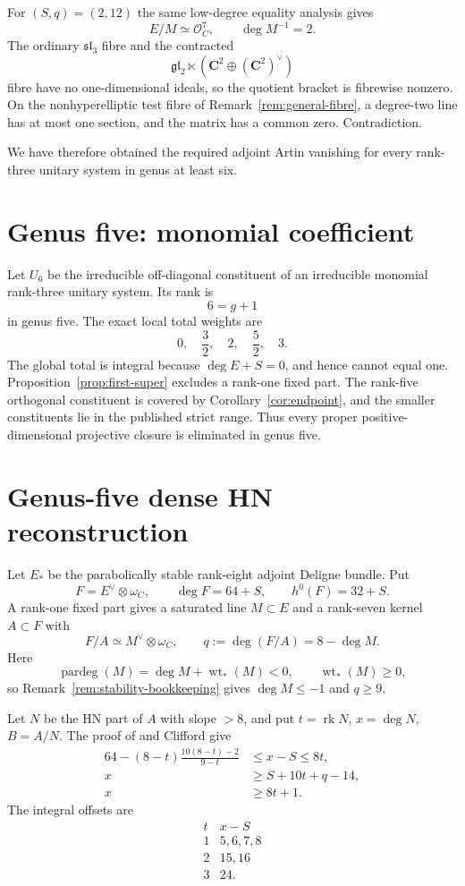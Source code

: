 \documentclass[11pt]{article}
\theoremstyle{definition}
\newcommand{\C}{\mathbf C}
\newcommand{\Ocal}{\mathcal O}
\newcommand{\rk}{\operatorname{rk}}
\newcommand{\degp}{\operatorname{pardeg}}
\begin{document}
For $(S,q)=(2,12)$ the same low-degree equality analysis gives
\[
 E/M\simeq\Ocal_C^7,
 \qquad \deg M^{-1}=2.
\]
The ordinary $\mathfrak{sl}_3$ fibre and the contracted
\[
 \mathfrak{gl}_2\ltimes(\C^2\oplus(\C^2)^\vee)
\]
fibre have no one-dimensional ideals, so the quotient bracket is fibrewise
nonzero.  On the nonhyperelliptic test fibre of
Remark~\ref{rem:general-fibre}, a degree-two line has at
most one section, and the matrix has a common zero.  Contradiction.

We have therefore obtained the required adjoint Artin vanishing for every
rank-three unitary system in genus at least six.

\section{Genus five: monomial coefficient}\label{sec:monomial5}

Let $U_6$ be the irreducible off-diagonal constituent of an irreducible
monomial rank-three unitary system.  Its rank is
\[
 6=g+1
\]
in genus five.  The exact local total weights are
\[
 0,\quad\frac32,\quad2,\quad\frac52,\quad3.
\]
The global total is integral because $\deg E+S=0$, and hence cannot equal
one.  Proposition~\ref{prop:first-super} excludes a rank-one fixed part.
The rank-five orthogonal constituent is covered by
Corollary~\ref{cor:endpoint}, and the smaller constituents lie in the
published strict range.  Thus every proper positive-dimensional projective
closure is eliminated in genus five.

\section{Genus-five dense HN reconstruction}\label{sec:hn5}

Let $E_*$ be the parabolically stable rank-eight adjoint Deligne bundle.  Put
\[
 F=E^\vee\otimes\omega_C,
 \qquad
 \deg F=64+S,
 \qquad
 h^0(F)=32+S.
\]
A rank-one fixed part gives a saturated line $M\subset E$ and a rank-seven
kernel $A\subset F$ with
\[
 F/A\simeq M^\vee\otimes\omega_C,
 \qquad
 q:=\deg(F/A)=8-\deg M.
\]
Here
\[
 \degp(M)=\deg M+\operatorname{wt}_*(M)<0,
 \qquad \operatorname{wt}_*(M)\ge0,
\]
so Remark~\ref{rem:stability-bookkeeping} gives $\deg M\le-1$ and $q\ge9$.

Let $N$ be the HN part of $A$ with slope $>8$, and put
$t=\rk N$, $x=\deg N$, $B=A/N$.  The proof of
\cite[Proposition 6.3.6]{LLGeo} and Clifford give
\begin{align}
64-(8-t)\frac{10(8-t)-2}{9-t}&\le x-S\le8t,
\label{eq:offset}\tag{7.1}\\
x&\ge S+10t+q-14,
\label{eq:cliff}\tag{7.2}\\
x&\ge8t+1.
\label{eq:high}\tag{7.3}
\end{align}
The integral offsets are
\[
\begin{array}{c|c}
t&x-S\\ \hline
1&5,6,7,8\\
2&15,16\\
3&24.
\end{array}
\]
\end{document}
